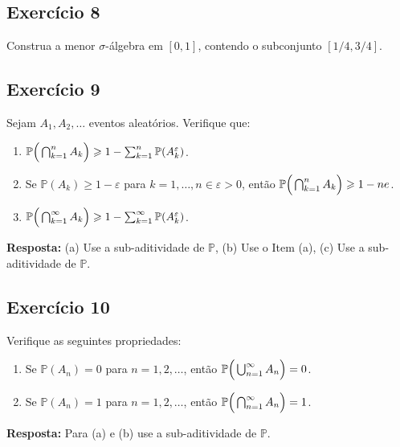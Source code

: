 \documentclass[
  letterpaper,
  DIV=11,
  numbers=noendperiod]{scrartcl}
\begin{document}
\hypertarget{exercuxedcio-8}{%
\subsection{Exercício 8}\label{exercuxedcio-8}}

Construa a menor \(\sigma\)-álgebra em \([0,1]\), contendo o subconjunto
\([1/4,3/4]\).

\hypertarget{exercuxedcio-9}{%
\subsection{Exercício 9}\label{exercuxedcio-9}}

Sejam \(A_{1},A_{2},\ldots\) eventos aleatórios. Verifique que:

\begin{enumerate}
\def\labelenumi{(\alph{enumi})}
\item
  \(\mathbb{P}\Big{(}\bigcap_{k=1}^{n}A_{k}\Big{)}\geqslant 1-\sum_{k=1}^{n}\mathbb{P}(A_{k}^{\varepsilon})\).
\item
  Se \(\mathbb{P}(A_{k})\geqslant 1-\varepsilon\) para
  \(k=1,\ldots,n\in\varepsilon>0\), então
  \(\mathbb{P}\Big{(}\bigcap_{k=1}^{n}A_{k}\Big{)}\geqslant 1-ne\).
\item
  \(\mathbb{P}\Big{(}\bigcap_{k=1}^{\infty}A_{k}\Big{)}\geqslant 1-\sum_{k=1}^{\infty}\mathbb{P}(A_{k}^{\varepsilon})\).
\end{enumerate}

\textbf{Resposta:} (a) Use a sub-aditividade de \(\mathbb{P}\), (b) Use
o Item (a), (c) Use a sub-aditividade de \(\mathbb{P}\).

\hypertarget{exercuxedcio-10}{%
\subsection{Exercício 10}\label{exercuxedcio-10}}

Verifique as seguintes propriedades:

\begin{enumerate}
\def\labelenumi{(\alph{enumi})}
\item
  Se \(\mathbb{P}(A_{n})=0\) para \(n=1,2,\ldots\), então
  \(\mathbb{P}\Big{(}\bigcup_{n=1}^{\infty}A_{n}\Big{)}=0\).
\item
  Se \(\mathbb{P}(A_{n})=1\) para \(n=1,2,\ldots\), então
  \(\mathbb{P}\Big{(}\bigcap_{n=1}^{\infty}A_{n}\Big{)}=1\).
\end{enumerate}

\textbf{Resposta:} Para (a) e (b) use a sub-aditividade de
\(\mathbb{P}\).
\end{document}
